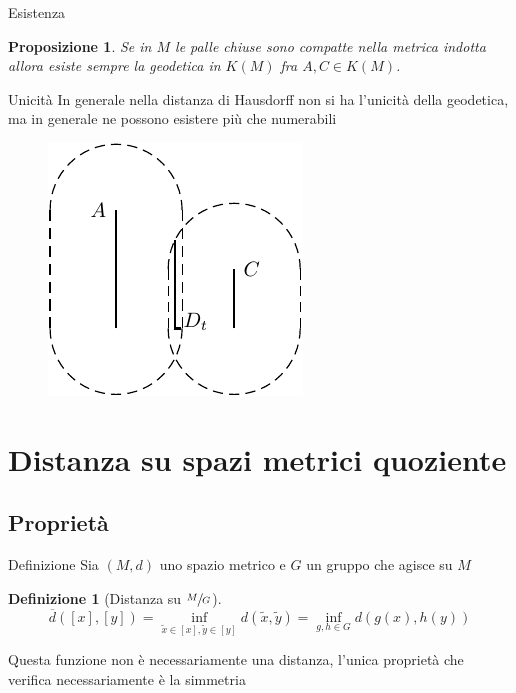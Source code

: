 \documentclass{beamer}
\newcounter{counter1}
\theoremstyle{plain}
\newtheorem{mylem}[counter1]{Lemma}
\newtheorem{mypro}[counter1]{Proposizione}
\theoremstyle{definition}
\newtheorem{mydef}[counter1]{Definizione}
\theoremstyle{remark}
\newcommand{\obar}[1]{\overline{#1}}
\newcommand{\bra}[1]{\left[#1\right]}
\begin{document}
\begin{frame}{Esistenza}
  \begin{mypro}
    Se in $M$ le palle chiuse sono compatte nella metrica indotta
    allora esiste sempre la geodetica in $K(M)$ fra $A,C \in K(M)$.
  \end{mypro}
\end{frame}
\begin{frame}{Unicità}
  In generale nella distanza di Hausdorff non si ha l'unicità della
  geodetica, ma in generale ne possono esistere più che numerabili
  \begin{figure}[h]
    \includegraphics[scale=1]{geodetichehausdorff.pdf}
  \end{figure}
\end{frame}

\section{Distanza su spazi metrici quoziente}

\subsection{Proprietà}

\begin{frame}{Definizione}
  Sia $(M,d)$ uno spazio metrico e $G$ un gruppo che agisce su $M$
  \begin{mydef}[Distanza su $\sfrac{M}{G}$]
    \[ \obar d (\bra{x}, \bra{y}) = \inf _{\tilde x \in \bra{x} ,
      \tilde y \in \bra {y}} d(\tilde x , \tilde y) = \inf _ {g,h \in
      G} d(g(x), h(y)) \]
  \end{mydef}

  Questa funzione non è necessariamente una distanza, l'unica
  proprietà che verifica necessariamente è la simmetria
\end{frame}
\end{document}
